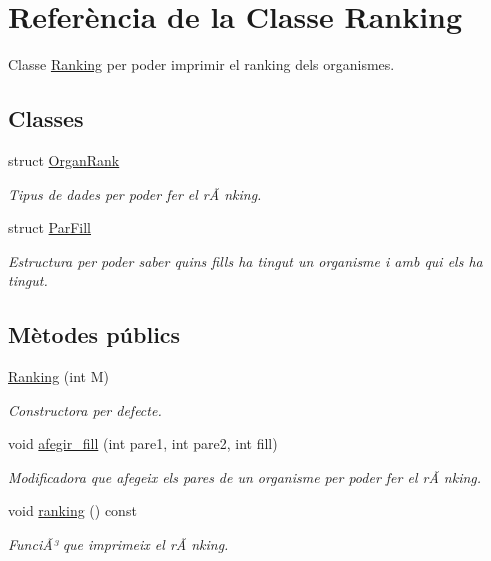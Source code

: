 \hypertarget{class_ranking}{\section{Referència de la Classe Ranking}
\label{class_ranking}
}


Classe \hyperlink{class_ranking}{Ranking} per poder imprimir el ranking dels organismes.  


\subsection*{Classes}
\begin{DoxyCompactItemize}
\item 
struct \hyperlink{struct_ranking_1_1_organ_rank}{Organ\-Rank}
\begin{DoxyCompactList}\small\item\em Tipus de dades per poder fer el rÃ nking. \end{DoxyCompactList}\item 
struct \hyperlink{struct_ranking_1_1_par_fill}{Par\-Fill}
\begin{DoxyCompactList}\small\item\em Estructura per poder saber quins fills ha tingut un organisme i amb qui els ha tingut. \end{DoxyCompactList}\end{DoxyCompactItemize}
\subsection*{Mètodes públics}
\begin{DoxyCompactItemize}
\item 
\hyperlink{class_ranking_af700e3f1e24eb35173adff4fbcac7c68}{Ranking} (int M)
\begin{DoxyCompactList}\small\item\em Constructora per defecte. \end{DoxyCompactList}\item 
void \hyperlink{class_ranking_a15715ea90e6caf702490fd329bf5ec70}{afegir\-\_\-fill} (int pare1, int pare2, int fill)
\begin{DoxyCompactList}\small\item\em Modificadora que afegeix els pares de un organisme per poder fer el rÃ nking. \end{DoxyCompactList}\item 
void \hyperlink{class_ranking_a2cb68818448b64432f2da6c7f3cfb446}{ranking} () const 
\begin{DoxyCompactList}\small\item\em FunciÃ³ que imprimeix el rÃ nking. \end{DoxyCompactList}\end{DoxyCompactItemize}
